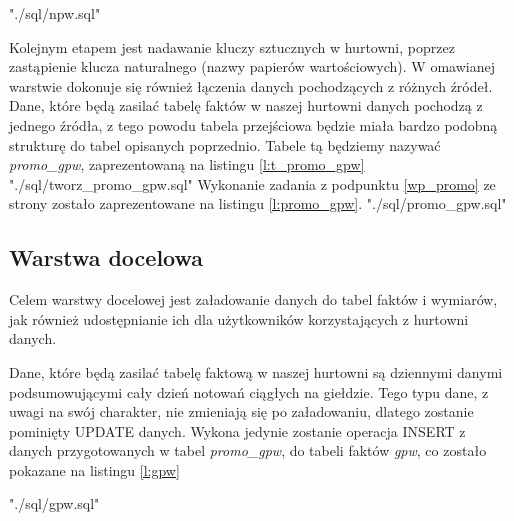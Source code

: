  {"./sql/npw.sql"}  

Kolejnym etapem jest nadawanie kluczy sztucznych w hurtowni,
 poprzez zastąpienie klucza naturalnego (nazwy papierów wartościowych).
W omawianej warstwie  dokonuje się również  łączenia danych pochodzących z różnych źródeł.
Dane, które będą zasilać tabelę faktów w naszej hurtowni danych pochodzą z jednego źródła, 
 z tego powodu tabela przejściowa będzie miała bardzo podobną strukturę do tabel opisanych poprzednio.
Tabele tą będziemy nazywać \textit{promo\_gpw}, zaprezentowaną na listingu \ref{l:t_promo_gpw}
 {"./sql/tworz_promo_gpw.sql"} 
Wykonanie zadania z podpunktu  \ref{wp_promo} ze strony \pageref{wp_promo} 
zostało zaprezentowane na listingu \ref{l:promo_gpw}.
 {"./sql/promo_gpw.sql"} 



\subsection{Warstwa docelowa} \label{warstwa_docelowa}
Celem warstwy docelowej jest załadowanie danych do tabel faktów i wymiarów,
 jak również udostępnianie ich dla użytkowników korzystających z hurtowni danych.

Dane, które będą zasilać tabelę faktową w naszej hurtowni są dziennymi danymi podsumowującymi cały dzień notowań ciągłych na giełdzie. 
Tego typu dane, 
 z uwagi na swój charakter,
 nie zmieniają się po załadowaniu,
 dlatego zostanie pominięty UPDATE danych. 
Wykona jedynie zostanie operacja INSERT z danych 
 przygotowanych w tabel \textit{promo\_gpw}, do tabeli faktów \textit{gpw}, 
 co zostało pokazane na listingu \ref{l:gpw}

 {"./sql/gpw.sql"} 


